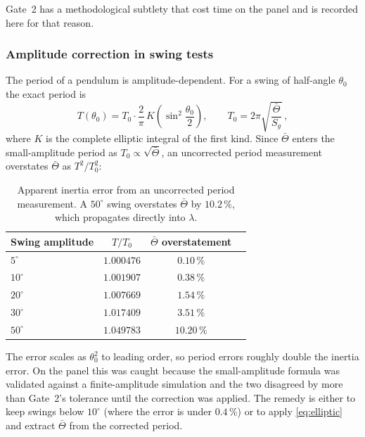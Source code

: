 Gate~2 has a methodological subtlety that cost time on the panel and is
recorded here for that reason.

\subsubsection{Amplitude correction in swing tests}
\label{sec:swing-amplitude}

The period of a pendulum is amplitude-dependent. For a swing of half-angle
$\theta_0$ the exact period is
%
\begin{equation}
  T(\theta_0) = T_0 \cdot \frac{2}{\pi}\,K\!\left(\sin^2\!\frac{\theta_0}{2}\right),
  \qquad T_0 = 2\pi\sqrt{\frac{\bar\Theta}{S_g}}\,,
  \label{eq:elliptic}
\end{equation}
%
where $K$ is the complete elliptic integral of the first kind. Since
$\bar\Theta$ enters the small-amplitude period as $T_0 \propto
\sqrt{\bar\Theta}$, an uncorrected period measurement overstates $\bar\Theta$
as $T^2/T_0^2$:

\begin{table}[htbp]
\centering
\small
\begin{tabular}{@{}lccc@{}}
\toprule
\textbf{Swing amplitude} & $T/T_0$ & $\bar\Theta$ \textbf{overstatement}\\
\midrule
$5^\circ$ & $1.000476$ & $0.10\,\%$\\
$10^\circ$ & $1.001907$ & $0.38\,\%$\\
$20^\circ$ & $1.007669$ & $1.54\,\%$\\
$30^\circ$ & $1.017409$ & $3.51\,\%$\\
$50^\circ$ & $1.049783$ & $10.20\,\%$\\
\bottomrule
\end{tabular}
\caption{Apparent inertia error from an uncorrected period measurement. A
$50^\circ$ swing overstates $\bar\Theta$ by $10.2\,\%$, which propagates
directly into $\lambda$.}
\label{tab:amplitude}
\end{table}

The error scales as $\theta_0^2$ to leading order, so period errors roughly
double the inertia error. On the panel this was caught because the
small-amplitude formula was validated against a finite-amplitude simulation
and the two disagreed by more than Gate~2's tolerance until the correction
was applied. The remedy is either to keep swings below $10^\circ$ (where the
error is under $0.4\,\%$) or to apply \eqref{eq:elliptic} and extract
$\bar\Theta$ from the corrected period.

